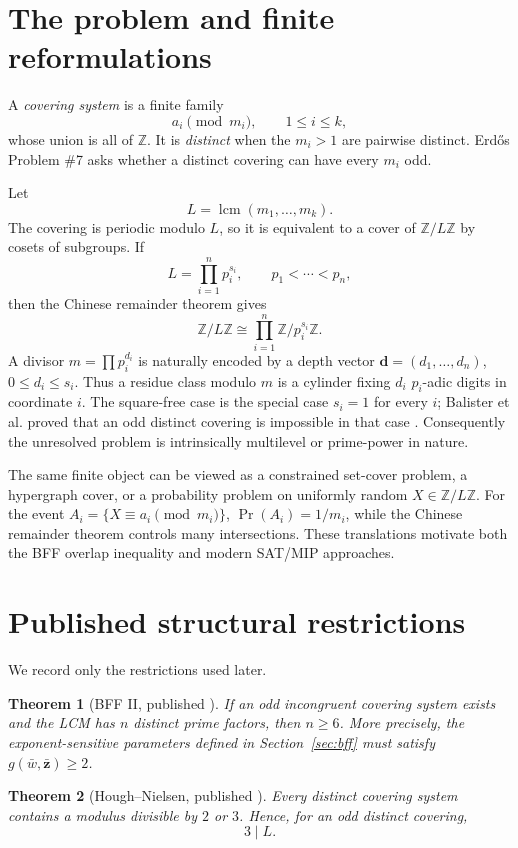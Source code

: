 \documentclass[11pt]{article}
\newtheorem{theorem}{Theorem}[section]
\theoremstyle{definition}
\newcommand{\Z}{\mathbb Z}
\DeclareMathOperator{\LCM}{lcm}
\begin{document}
\section{The problem and finite reformulations}

A \emph{covering system} is a finite family
\[
 a_i\pmod{m_i},\qquad 1\le i\le k,
\]
whose union is all of $\Z$.  It is \emph{distinct} when the $m_i>1$ are pairwise distinct.
Erd\H{o}s Problem \#7 asks whether a distinct covering can have every $m_i$ odd.

Let
\[
 L=\LCM(m_1,\dots,m_k).
\]
The covering is periodic modulo $L$, so it is equivalent to a cover of $\Z/L\Z$ by cosets of
subgroups.  If
\[
 L=\prod_{i=1}^{n}p_i^{s_i},\qquad p_1<\cdots<p_n,
\]
then the Chinese remainder theorem gives
\[
 \Z/L\Z\cong\prod_{i=1}^{n}\Z/p_i^{s_i}\Z.
\]
A divisor $m=\prod p_i^{d_i}$ is naturally encoded by a depth vector
$\mathbf d=(d_1,\dots,d_n)$, $0\le d_i\le s_i$.  Thus a residue class modulo $m$ is a cylinder
fixing $d_i$ $p_i$-adic digits in coordinate $i$.  The square-free case is the special case
$s_i=1$ for every $i$; Balister et al. proved that an odd distinct covering is impossible in
that case \cite{BalisterSquarefree2021}.  Consequently the unresolved problem is intrinsically
multilevel or prime-power in nature.

The same finite object can be viewed as a constrained set-cover problem, a hypergraph cover,
or a probability problem on uniformly random $X\in\Z/L\Z$.  For the event
$A_i=\{X\equiv a_i\pmod{m_i}\}$, $\Pr(A_i)=1/m_i$, while the Chinese remainder theorem controls
many intersections.  These translations motivate both the BFF overlap inequality and modern
SAT/MIP approaches.

\section{Published structural restrictions}

We record only the restrictions used later.

\begin{theorem}[BFF II, published \cite{BFF1987}]
If an odd incongruent covering system exists and the LCM has $n$ distinct prime factors, then
$n\ge6$.  More precisely, the exponent-sensitive parameters defined in Section~\ref{sec:bff}
must satisfy $g(\bar w,\bar{\mathbf z})\ge2$.
\end{theorem}

\begin{theorem}[Hough--Nielsen, published \cite{HoughNielsen2019}]
Every distinct covering system contains a modulus divisible by $2$ or $3$.
Hence, for an odd distinct covering,
\[
 3\mid L.
\]
\end{theorem}
\end{document}
